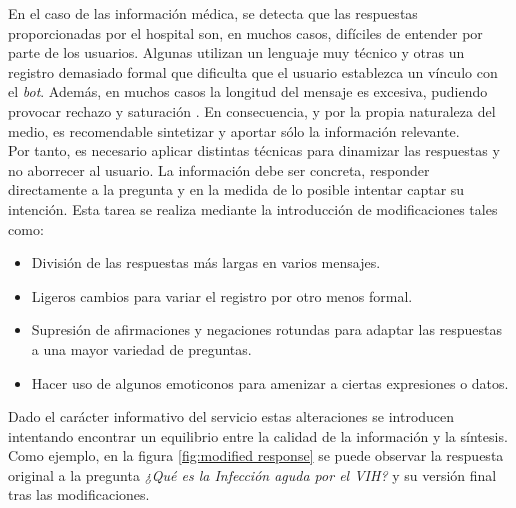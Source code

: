 En el caso de las información médica, se detecta que las respuestas proporcionadas por el hospital son, en muchos casos, difíciles de entender por parte de los usuarios. Algunas utilizan un lenguaje muy técnico y otras un registro demasiado formal que dificulta que el usuario establezca un vínculo con el \textit{bot}. Además, en muchos casos la longitud del mensaje es excesiva, pudiendo provocar rechazo y saturación \cite{shouldInteract}. En consecuencia, y por la propia naturaleza del medio, es recomendable sintetizar y aportar sólo la información relevante.\\

Por tanto, es necesario aplicar distintas técnicas para dinamizar las respuestas y no aborrecer al usuario. La información debe ser concreta, responder directamente a la pregunta y en la medida de lo posible intentar captar su intención. Esta tarea se realiza mediante la introducción de modificaciones tales como:

\begin{itemize}
	\item División de las respuestas más largas en varios mensajes.
	\item Ligeros cambios para variar el registro por otro menos formal.
	\item Supresión de afirmaciones y negaciones rotundas para adaptar las respuestas a una mayor variedad de preguntas.
	\item Hacer uso de algunos emoticonos para amenizar a ciertas expresiones o datos.
\end{itemize}

Dado el carácter informativo del servicio estas alteraciones se introducen intentando encontrar un equilibrio entre la calidad de la información y la síntesis. Como ejemplo, en la figura \ref{fig:modified response} se puede observar la respuesta original a la pregunta \textit{¿Qué es la Infección aguda por el VIH?} y su versión final tras las modificaciones.

